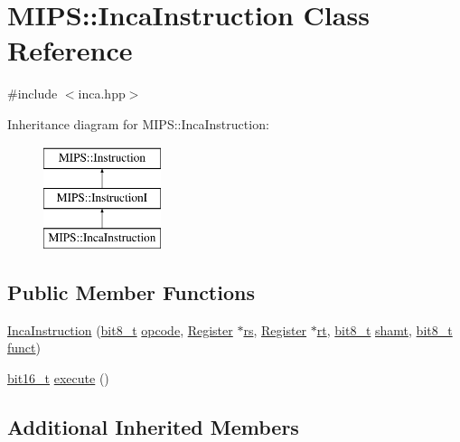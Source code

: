 \hypertarget{classMIPS_1_1IncaInstruction}{}\section{M\+I\+PS\+:\+:Inca\+Instruction Class Reference}
\label{classMIPS_1_1IncaInstruction}


{\ttfamily \#include $<$inca.\+hpp$>$}

Inheritance diagram for M\+I\+PS\+:\+:Inca\+Instruction\+:\begin{figure}[H]
\begin{center}
\leavevmode
\includegraphics[height=3.000000cm]{classMIPS_1_1IncaInstruction}
\end{center}
\end{figure}
\subsection*{Public Member Functions}
\begin{DoxyCompactItemize}
\item 
\hyperlink{classMIPS_1_1IncaInstruction_a03f08716ad682f74db7aef71961c4b09}{Inca\+Instruction} (\hyperlink{core_8hpp_a6074bae122ae7b527864eec42c728c3c}{bit8\+\_\+t} \hyperlink{classMIPS_1_1Instruction_a45cc6808b5dde8a5d41067d148b55476}{opcode}, \hyperlink{classMIPS_1_1Register}{Register} $\ast$\hyperlink{classMIPS_1_1InstructionI_a2be191d5b3dce505e2e626ec02eb4d62}{rs}, \hyperlink{classMIPS_1_1Register}{Register} $\ast$\hyperlink{classMIPS_1_1InstructionI_add1db07a5c954f35271de8c8a5737487}{rt}, \hyperlink{core_8hpp_a6074bae122ae7b527864eec42c728c3c}{bit8\+\_\+t} \hyperlink{classMIPS_1_1InstructionI_aa9b6da37c374c2ec8d96448d341e5e7d}{shamt}, \hyperlink{core_8hpp_a6074bae122ae7b527864eec42c728c3c}{bit8\+\_\+t} \hyperlink{classMIPS_1_1InstructionI_a5c6efcbbd233a7447c1fe24ea0a1e558}{funct})
\item 
\hyperlink{core_8hpp_adc265a970bc35995b5879784bbb3f1b7}{bit16\+\_\+t} \hyperlink{classMIPS_1_1IncaInstruction_ac78e4a0b037ab4b6b419f4f5a34413c7}{execute} ()
\end{DoxyCompactItemize}
\subsection*{Additional Inherited Members}


